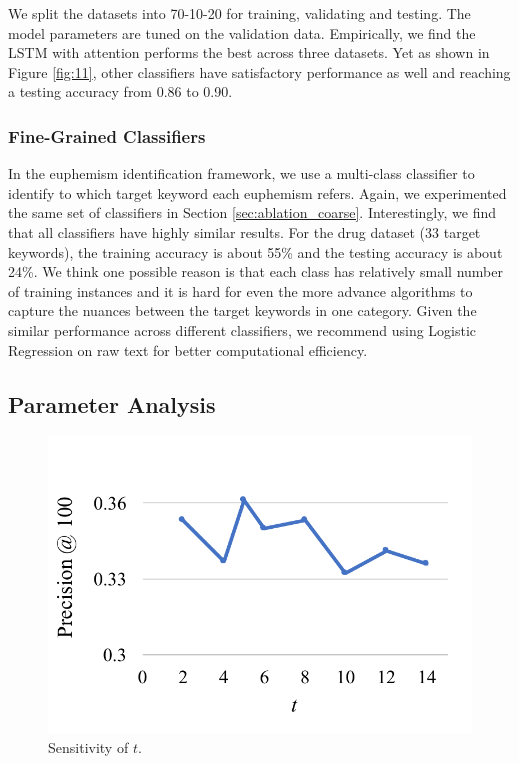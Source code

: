 We split the datasets into 70-10-20 for training, validating and testing. 
The model parameters are tuned on the validation data. 
Empirically, we find the LSTM with attention performs the best across three datasets. 
Yet as shown in Figure \ref{fig:11}, other classifiers have satisfactory performance as well and reaching a testing accuracy from 0.86 to 0.90. 



\subsubsection{Fine-Grained Classifiers}
\label{sec:ablation_fine-grained}
In the euphemism identification framework, we use a multi-class classifier to identify to which target keyword each euphemism refers. 
Again, we experimented the same set of classifiers in Section \ref{sec:ablation_coarse}. 
Interestingly, we find that all classifiers have highly similar results. 
For the drug dataset (33 target keywords), the training accuracy is about 55\% and the testing accuracy is about 24\%. 
We think one possible reason is that each class has relatively small number of training instances and it is hard for even the more advance algorithms to capture the nuances between the target keywords in one category. 
Given the similar performance across different classifiers, we recommend using Logistic Regression on raw text for better computational efficiency. 




\subsection{Parameter Analysis}
\label{sec:dis_parameter_analysis}
\begin{figure}[ht!]
	\centering
	\includegraphics[width=0.6\linewidth]{figures/12}
	\caption{Sensitivity of $t$.}
	\label{fig:12}
\end{figure}

